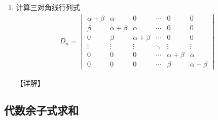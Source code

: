 \documentclass[12pt, a4paper, oneside, UTF8]{ctexbook}
\begin{document}
\begin{enumerate}[label=\arabic*.]
    \item 计算三对角线行列式
    \begin{align*}
    D_{n}= 
    \begin{vmatrix}
    \alpha+\beta & \alpha & 0 & \cdots & 0 & 0 \\
    \beta & \alpha+\beta & \alpha & \cdots & 0 & 0 \\
    0 & \beta & \alpha+\beta & \cdots & 0 & 0 \\
    \vdots & \vdots & \vdots & \ddots & \vdots & \vdots \\
    0 & 0 & 0 & \cdots & \alpha+\beta & \alpha \\
    0 & 0 & 0 & \cdots & \beta & \alpha+\beta
    \end{vmatrix}
    \end{align*}
    
    \begin{solution}
    【详解】
    \end{solution}
\end{enumerate}

\subsection{代数余子式求和}
\end{document}
